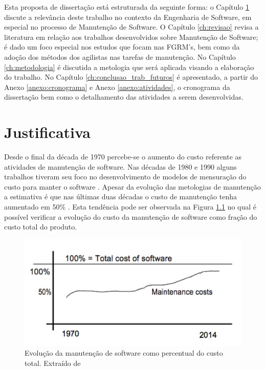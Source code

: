 \documentclass[msc,proposal,hidelot,hideabstract]{ppgccufmg} %
\begin{document}
Esta proposta de dissertação está estruturada da seguinte forma: o  Capítulo
\ref{ch:justificativa} discute a relevância deste trabalho no contexto da Engenharia de Software, em especial no processo de Manutenção de Software. O Capítulo \ref{ch:revisao} revisa a literatura em relação aos trabalhos desenvolvidos sobre Manutenção de Software; é dado um foco especial
nos estudos que focam nas FGRM's, bem como da adoção dos métodos dos agilistas nas tarefas de manutenção. No Capítulo \ref{ch:metodologia} é discutida a metologia que será aplicada visando a elaboração do trabalho. No Capítulo \ref{ch:conclusao_trab_futuros} é apresentado, a partir do Anexo \ref{anexo:cronograma} e Anexo \ref{anexo:atividades}, o cronograma da dissertação bem como o detalhamento das atividades a serem desenvolvidas.

\chapter{Justificativa}
\label{ch:justificativa}
Desde o final da década de 1970 \cite{Zelkowitz:1979:PSE:578504} percebe-se o aumento do custo referente as atividades de  manutenção de software. Nas décadas de 1980 e 1990 alguns
trabalhos tiveram seu foco no desenvolvimento de modelos de mensuração do custo
para manter o software \cite{Herrin:1985:SMC:323287.323383,hirota1994approach}. Apesar da evolução das metologias de manutenção a estimativa é que nas últimas duas décadas o custo de manutenção tenha aumentado em 50\% \cite{koskinen2010software}. Esta tendência pode ser observada na Figura \ref{fig:software-maintence-costs} no qual é possível verificar a evolução do custo da manutenção de software como fração do custo total do produto.

\begin{figure}
\centering
\includegraphics[width=0.7\linewidth]{../img/software-maintence-costs}
\caption{Evolução da manutenção de software como percentual do custo total.	Extraído de	\cite{engelbertink2010save}}

\label{fig:software-maintence-costs}
\end{figure}
\end{document}
